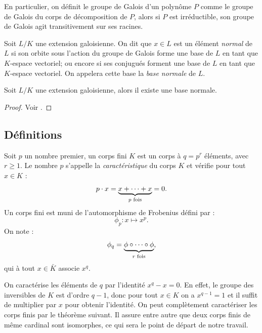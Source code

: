 \documentclass[a4paper]{article} %
\numberwithin{section}{part}
\numberwithin{equation}{section}
\begin{document}
\begin{rem}
En particulier, on définit le groupe de Galois d'un polynôme $P$ comme le
groupe de Galois du corps de décomposition de $P$, alors si $P$ est
irréductible, son groupe de Galois agit transitivement sur ses racines.
\end{rem}

\begin{defn}
\label{def:elemnorm}
Soit $L/K$ une extension galoisienne. On dit que $x\in L$ est un élément
\emph{normal} de $L$ si son orbite sous l'action du groupe de Galois forme une 
base de $L$ en tant que $K$-espace vectoriel; ou encore si ses conjugués forment
une base de $L$ en tant que $K$-espace vectoriel. On appelera cette base la 
\emph{base normale} de $L$.
\end{defn}

\begin{thm}
Soit $L/K$ une extension galoisienne, alors il existe une base normale.
\end{thm}
\begin{proof}
Voir \cite[th. 3.72]{LiNi1}.
\end{proof}

\subsection{Définitions}
Soit $p$ un nombre premier, un corps fini $K$ est un corps à $q = p^r$ éléments,
avec $r\geq1$. Le nombre $p$ s'appelle la \emph{caractéristique} du corps $K$ et
vérifie pour tout $x\in K$ :
\begin{equation}
p\cdot x = \underbrace{x+\dots+x}_{p\textup{ fois}} = 0.
\end{equation}
Un corps fini est muni de l'automorphisme de Frobenius défini par :
\begin{equation}
\phi_p : x \mapsto x^p.
\end{equation}
On note :
\begin{equation}
\phi_q = \underbrace{\phi\circ\cdots\circ\phi}_{r\textup{
fois}},
\end{equation}
qui à tout $x\in \bar{K}$ associe $x^q$.\par
On caractérise les éléments de $q$ par l'identité $x^q - x = 0$. En effet, le
groupe des inversibles de $K$ est d'ordre $q-1$, donc pour tout $x\in K$ on a
$x^{q-1} = 1$ et il suffit de multiplier par $x$ pour obtenir l'identité.
On peut complètement caractériser les corps finis par le théorème suivant. Il
assure entre autre que deux corps finis de même cardinal sont isomorphes, ce qui
sera le point de départ de notre travail.
\end{document}
